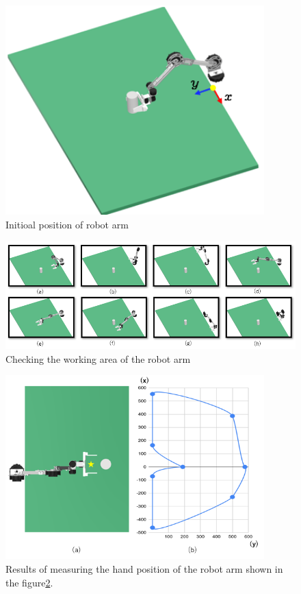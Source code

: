 \begin{figure}
  \centering
  \includegraphics[width=10cm]{images/design/syoki.png}
  \caption{Initioal position of robot arm}
  \label{fig:syokisisei}
\end{figure}
\begin{figure}
  \centering
  \includegraphics[width=13cm]{images/design/arm_move.png}
  \caption{Checking the working area of the robot arm}
  \label{fig:arm_move}
\end{figure}
\begin{figure}
  \centering
  \includegraphics[width=10cm]{images/design/prot.png}
  \caption{Results of measuring the hand position of the robot arm shown in the figure\ref{fig:arm_move}.}
  \label{fig:prot}
\end{figure}
\clearpage

